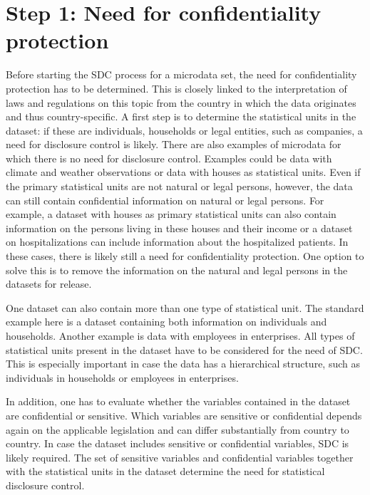 \documentclass[letterpaper,10pt,english]{sphinxmanual}
\begin{document}
\section{Step 1: Need for confidentiality protection}
\label{\detokenize{process:step-1-need-for-confidentiality-protection}}
Before starting the SDC process for a microdata set, the need for
confidentiality protection has to be determined. This is closely linked
to the interpretation of laws and regulations on this topic from the
country in which the data originates and thus country-specific. A first
step is to determine the statistical units in the dataset: if these are
individuals, households or legal entities, such as companies, a need for
disclosure control is likely. There are also examples of microdata for
which there is no need for disclosure control. Examples could be data
with climate and weather observations or data with houses as statistical
units. Even if the primary statistical units are not natural or legal
persons, however, the data can still contain confidential information on
natural or legal persons. For example, a dataset with houses as primary
statistical units can also contain information on the persons living in
these houses and their income or a dataset on hospitalizations can
include information about the hospitalized patients. In these cases,
there is likely still a need for confidentiality protection. One option
to solve this is to remove the information on the natural and legal
persons in the datasets for release.

One dataset can also contain more than one type of statistical unit. The
standard example here is a dataset containing both information on
individuals and households. Another example is data with employees in
enterprises. All types of statistical units present in the dataset have
to be considered for the need of SDC. This is especially important in
case the data has a hierarchical structure, such as individuals in
households or employees in enterprises.

In addition, one has to evaluate whether the variables contained in the
dataset are confidential or sensitive. Which variables are sensitive or
confidential depends again on the applicable legislation and can differ
substantially from country to country. In case the dataset includes
sensitive or confidential variables, SDC is likely required. The set of
sensitive variables and confidential variables together with the
statistical units in the dataset determine the need for statistical
disclosure control.
\end{document}
